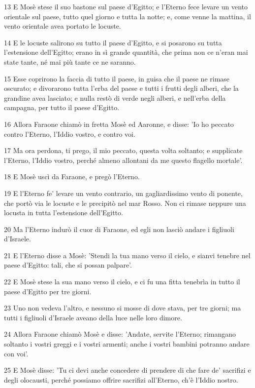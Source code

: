 \par 13 E Mosè stese il suo bastone sul paese d'Egitto; e l'Eterno fece levare un vento orientale sul paese, tutto quel giorno e tutta la notte; e, come venne la mattina, il vento orientale avea portato le locuste.
\par 14 E le locuste salirono su tutto il paese d'Egitto, e si posarono su tutta l'estensione dell'Egitto; erano in sì grande quantità, che prima non ce n'eran mai state tante, né mai più tante ce ne saranno.
\par 15 Esse coprirono la faccia di tutto il paese, in guisa che il paese ne rimase oscurato; e divorarono tutta l'erba del paese e tutti i frutti degli alberi, che la grandine avea lasciato; e nulla restò di verde negli alberi, e nell'erba della campagna, per tutto il paese d'Egitto.
\par 16 Allora Faraone chiamò in fretta Mosè ed Aaronne, e disse: 'Io ho peccato contro l'Eterno, l'Iddio vostro, e contro voi.
\par 17 Ma ora perdona, ti prego, il mio peccato, questa volta soltanto; e supplicate l'Eterno, l'Iddio vostro, perché almeno allontani da me questo flagello mortale'.
\par 18 E Mosè uscì da Faraone, e pregò l'Eterno.
\par 19 E l'Eterno fe' levare un vento contrario, un gagliardissimo vento di ponente, che portò via le locuste e le precipitò nel mar Rosso. Non ci rimase neppure una locusta in tutta l'estensione dell'Egitto.
\par 20 Ma l'Eterno indurò il cuor di Faraone, ed egli non lasciò andare i figliuoli d'Israele.
\par 21 E l'Eterno disse a Mosè: 'Stendi la tua mano verso il cielo, e sianvi tenebre nel paese d'Egitto: tali, che si possan palpare'.
\par 22 E Mosè stese la sua mano verso il cielo, e ci fu una fitta tenebrìa in tutto il paese d'Egitto per tre giorni.
\par 23 Uno non vedeva l'altro, e nessuno si mosse di dove stava, per tre giorni; ma tutti i figliuoli d'Israele aveano della luce nelle loro dimore.
\par 24 Allora Faraone chiamò Mosè e disse: 'Andate, servite l'Eterno; rimangano soltanto i vostri greggi e i vostri armenti; anche i vostri bambini potranno andare con voi'.
\par 25 E Mosè disse: 'Tu ci devi anche concedere di prendere di che fare de' sacrifizi e degli olocausti, perché possiamo offrire sacrifizi all'Eterno, ch'è l'Iddio nostro.
